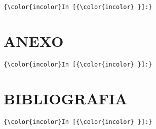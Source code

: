 \documentclass[11pt]{article}
\begin{document}
    \begin{Verbatim}[commandchars=\\\{\}]
{\color{incolor}In [{\color{incolor} }]:} 
\end{Verbatim}

    \section{ANEXO}\label{anexo}

    \begin{Verbatim}[commandchars=\\\{\}]
{\color{incolor}In [{\color{incolor} }]:} 
\end{Verbatim}

    \section{BIBLIOGRAFIA}\label{bibliografia}

    \begin{Verbatim}[commandchars=\\\{\}]
{\color{incolor}In [{\color{incolor} }]:} 
\end{Verbatim}


    
    
    
    
\end{document}
